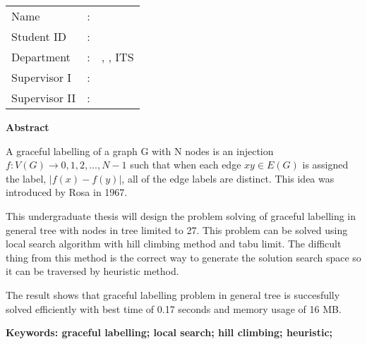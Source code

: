 \begin{tabularx}{\linewidth}{ l l X }
	Name 			& : & \penulis \\
	Student ID		& :	& \nrp \\
	Department 		& : & \jurusaneng, \newline \fakultaseng, ITS \\
	Supervisor I 	& : & \pembimbingsatu \\
	Supervisor II 	& : & \pembimbingdua
	\vspace*{1em} 	%
\end {tabularx}
	
\noindent\textbf{Abstract} \\
\itshape
\par A graceful labelling of a graph G with N nodes is an injection $ f : V(G) \rightarrow {0,1,2,...,N-1} $ such that when each edge $ xy \in E(G) $ is assigned the label, $ | f(x) - f(y) | $, all of the edge labels are distinct. This idea was introduced by Rosa in 1967.
\par This undergraduate thesis will design the problem solving of graceful labelling in general tree with nodes in tree limited to 27. This problem can be solved using local search algorithm with hill climbing method and tabu limit. The difficult thing from this method is the correct way to generate the solution search space so it can be traversed by heuristic method.
\par The result shows that graceful labelling problem in general tree is succesfully solved efficiently with best time of 0.17 seconds and memory usage of 16 MB.

\vspace*{1em}
\noindent\bfseries Keywords: graceful labelling; local search; hill climbing; heuristic;
\normalfont
\cleardoublepage